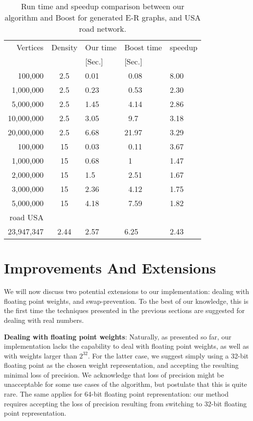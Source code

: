\documentclass[conference,10pt,twocolumn]{IEEEtran}
\begin{document}
\begin{table}
\begin{tabular}{| r | c | l | l |l|}
\hline
Vertices & Density & Our time & Boost time & speedup \\ 
    &   &   [Sec.] & [Sec.] & \\ \hline\hline
100,000 & 2.5 & 0.01 & ~0.08 & 8.00 \\ \hline
1,000,000 & 2.5 & 0.23 & ~0.53 & 2.30 \\ \hline
5,000,000 & 2.5 & 1.45 & ~4.14 & 2.86 \\ \hline
10,000,000 & 2.5 & 3.05 & ~9.7 & 3.18 \\ \hline
20,000,000 & 2.5 & 6.68 & 21.97 & 3.29 \\ \hline\hline
100,000 & 15 & 0.03 & ~0.11 & 3.67 \\ \hline
1,000,000 & 15 & 0.68 & ~1 & 1.47 \\ \hline
2,000,000 & 15 & 1.5 & ~2.51 & 1.67 \\ \hline
3,000,000 & 15 & 2.36 & ~4.12 & 1.75 \\ \hline
5,000,000 & 15 & 4.18 & ~7.59 & 1.82\\ \hline\hline
road USA & & &  & \\
23,947,347 & 2.44 & 2.57 & 6.25 & 2.43\\ \hline   \end{tabular}
\caption{Run time and speedup comparison between our algorithm and Boost for generated E-R graphs, and USA road network. }
\label{tab:time}
\end{table}

\section{Improvements And Extensions}  \label{sec:extn}
We will now discuss two potential extensions to our implementation: dealing with floating point weights, and swap-prevention.  To the best of our knowledge, this is the first time the techniques presented in the previous sections are suggested for dealing with real numbers.

{\bf Dealing with floating point weights}: Naturally, as presented so far, our implementation lacks the capability to deal with floating point weights, as well as with weights larger than $2^{32}$. For the latter case, we suggest simply using a 32-bit floating point as the chosen weight representation, and accepting the resulting minimal loss of precision. We acknowledge that loss of precision might be unacceptable for some use cases of the algorithm, but postulate that this is quite rare. The same applies for 64-bit floating point representation: our method requires accepting the loss of precision resulting from switching to 32-bit floating point representation.
\end{document}
